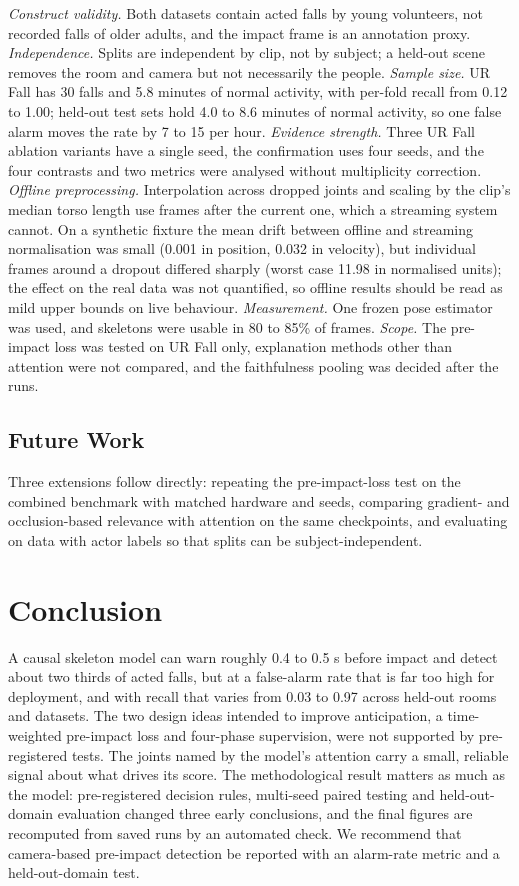 \documentclass[journal]{IEEEtran}
\begin{document}
\textit{Construct validity.} Both datasets contain acted falls by young volunteers, not recorded falls of older adults, and the impact frame is an annotation proxy. \textit{Independence.} Splits are independent by clip, not by subject; a held-out scene removes the room and camera but not necessarily the people. \textit{Sample size.} UR Fall has 30 falls and 5.8 minutes of normal activity, with per-fold recall from 0.12 to 1.00; held-out test sets hold 4.0 to 8.6 minutes of normal activity, so one false alarm moves the rate by 7 to 15 per hour. \textit{Evidence strength.} Three UR Fall ablation variants have a single seed, the confirmation uses four seeds, and the four contrasts and two metrics were analysed without multiplicity correction. \textit{Offline preprocessing.} Interpolation across dropped joints and scaling by the clip's median torso length use frames after the current one, which a streaming system cannot. On a synthetic fixture the mean drift between offline and streaming normalisation was small (0.001 in position, 0.032 in velocity), but individual frames around a dropout differed sharply (worst case 11.98 in normalised units); the effect on the real data was not quantified, so offline results should be read as mild upper bounds on live behaviour. \textit{Measurement.} One frozen pose estimator was used, and skeletons were usable in 80 to 85\% of frames. \textit{Scope.} The pre-impact loss was tested on UR Fall only, explanation methods other than attention were not compared, and the faithfulness pooling was decided after the runs.


\subsection{Future Work}\label{sub:future}

Three extensions follow directly: repeating the pre-impact-loss test on the combined benchmark with matched hardware and seeds, comparing gradient- and occlusion-based relevance with attention on the same checkpoints, and evaluating on data with actor labels so that splits can be subject-independent.


\section{Conclusion}\label{sec:conclusion}

A causal skeleton model can warn roughly 0.4 to 0.5 s before impact and detect about two thirds of acted falls, but at a false-alarm rate that is far too high for deployment, and with recall that varies from 0.03 to 0.97 across held-out rooms and datasets. The two design ideas intended to improve anticipation, a time-weighted pre-impact loss and four-phase supervision, were not supported by pre-registered tests. The joints named by the model's attention carry a small, reliable signal about what drives its score. The methodological result matters as much as the model: pre-registered decision rules, multi-seed paired testing and held-out-domain evaluation changed three early conclusions, and the final figures are recomputed from saved runs by an automated check. We recommend that camera-based pre-impact detection be reported with an alarm-rate metric and a held-out-domain test.
\end{document}
